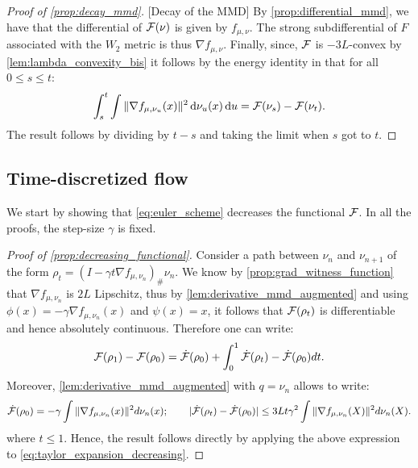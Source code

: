 
\begin{proof}[Proof of \cref{prop:decay_mmd}]\label{proof:prop:decay_mmd}[Decay of the MMD]
By \eqref{prop:differential_mmd}, we have that the differential of ${{\mathcal F}}(\nu)$ is given by $f_{\mu,\nu}$. The strong subdifferential of $F$ associated with the $W_2$ metric is thus $\nabla f_{\mu, \nu}$. Finally, since, ${{\mathcal F}}$ is $-3L$-convex by \cref{lem:lambda_convexity_bis} it follows by the energy identity in \cite[Theorem 11.3.2]{ambrosio2008gradient}  that for all $0\leq s\leq t$:
\[
\int_s^t \int \Vert \nabla f_{\mu,\nu_u}(x) \Vert^2\mathop{}\!\mathrm{d} \nu_u(x)\mathop{}\!\mathrm{d} u = {{\mathcal F}}(\nu_s)-{{\mathcal F}}(\nu_t).
\]
The result follows by dividing by $t-s$ and taking the limit when $s$ got to $t$.
\end{proof}




\subsection{Time-discretized flow}\label{appendix:subsec:convegence_time_discrete}
We start by showing that \cref{eq:euler_scheme} decreases the functional ${{\mathcal F}}$. In all the proofs, the step-size $\gamma$ is fixed.

\begin{proof}[Proof of \cref{prop:decreasing_functional}]\label{proof:prop:decreasing_functional}
	Consider a path between $\nu_n$ and $\nu_{n+1}$ of the form $\rho_t	=(I-\gamma t\nabla f_{\mu,\nu_n})_{\#}\nu_n$. We know by \cref{prop:grad_witness_function} that $\nabla f_{\mu,\nu_n}$ is $2L$ Lipschitz, thus by \cref{lem:derivative_mmd_augmented} and using $\phi(x) = -\gamma \nabla f_{\mu,\nu_n}(x)$ and $\psi(x) = x$, it follows that ${{\mathcal F}}(\rho_t)$ is differentiable and hence absolutely continuous. Therefore one can write:
	\begin{align}\label{eq:taylor_expansion_decreasing}
	\mathcal{F}(\rho_1)-\mathcal{F}(\rho_0) = \dot{\mathcal{F}}(\rho_0)+  \int_0^1 \dot{{{\mathcal F}}}(\rho_t)- \dot{{{\mathcal F}}}(\rho_0)dt.
	\end{align}
	Moreover, \cref{lem:derivative_mmd_augmented} with $q=\nu_n$ allows to write:
	\begin{align*}
		\dot{\mathcal{F}}(\rho_0) = -\gamma \int \Vert \nabla f_{\mu,\nu_n}(x) \Vert^2 d\nu_n(x); \qquad \vert \dot{{{\mathcal F}}}(\rho_t)- \dot{{{\mathcal F}}}(\rho_0)\vert \leq 3L t\gamma^2 \int \Vert \nabla f_{\mu,\nu_n}(X) \Vert^2 d\nu_n(X).
	\end{align*}
	where $t\le 1$. Hence, the result follows directly by applying the above expression to \cref{eq:taylor_expansion_decreasing}.
\end{proof}

